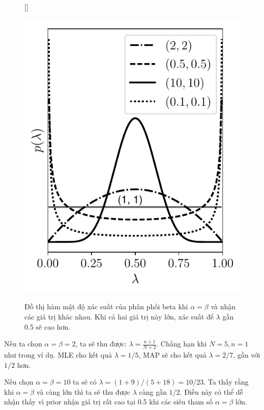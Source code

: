 \begin{figure}[t]
    [\FBwidth]
    {\caption{ Đồ thị hàm mật độ xác suất của phân phối beta khi $\alpha =
    \beta$ và nhận các giá trị khác nhau. Khi cả hai giá trị này lớn, xác suất
    để $\lambda$ gần 0.5 sẽ cao hơn. }
    \label{fig:31_1}}
    { %
    \includegraphics[width=.45\textwidth]{Chapters/02_LinearAlgebra/30_prob/python/beta1.pdf}
    }
\end{figure}

 
 
 
 
Nếu ta chọn $\alpha = \beta = 2$, ta sẽ thu được: 
\begin{math} \displaystyle 
  \lambda= \frac{n + 1}{N + 2} 
\end{math}.
Chẳng hạn khi $N = 5, n = 1$ như trong ví dụ. MLE cho kết quả $\lambda = 1/5$,
MAP sẽ cho kết quả $\lambda = 2/7$, gần với $1/2$ hơn. 
 
Nếu chọn $\alpha = \beta = 10$ ta sẽ có $\lambda = (1 + 9)/(5 + 18) = 10/23$. Ta
thấy rằng khi $\alpha = \beta$ và càng lớn thì ta sẽ thu được $\lambda$ càng gần
$1/2$. Điều này có thể dễ nhận thấy vì prior nhận giá trị rất cao tại 0.5 khi
các siêu tham số $\alpha = \beta$ lớn. 
 
